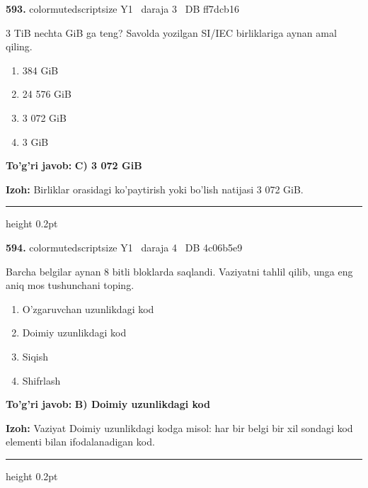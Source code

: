 \documentclass[10pt,a4paper,oneside]{article}
\begin{document}
\noindent\textbf{\color{ink}593.}  {color{muted}scriptsize Y1 \textbullet\ daraja 3 \textbullet\ DB ff7dcb16}
\par
3 TiB nechta GiB ga teng? Savolda yozilgan SI/IEC birliklariga aynan amal qiling.
\begin{enumerate}[label=\Alph*),leftmargin=9mm]
\item 384 GiB
\item 24 576 GiB
\item 3 072 GiB
\item 3 GiB
\end{enumerate}
\begin{tcolorbox}[enhanced,breakable,colback=teal!4,colframe=teal!50!black,boxrule=0.5pt,arc=1.1mm,left=3mm,right=3mm,top=1.7mm,bottom=1.7mm,before skip=2mm,after skip=2mm]
\textbf{\color{teal}To'g'ri javob:} \textbf{C) 3 072 GiB}
\par\smallskip
\textbf{Izoh:} Birliklar orasidagi ko'paytirish yoki bo'lish natijasi 3 072 GiB.
\end{tcolorbox}
\vspace{2mm}\hrule height 0.2pt \vspace{3mm}

\noindent\textbf{\color{ink}594.}  {color{muted}scriptsize Y1 \textbullet\ daraja 4 \textbullet\ DB 4c06b5e9}
\par
Barcha belgilar aynan 8 bitli bloklarda saqlandi. Vaziyatni tahlil qilib, unga eng aniq mos tushunchani toping.
\begin{enumerate}[label=\Alph*),leftmargin=9mm]
\item O'zgaruvchan uzunlikdagi kod
\item Doimiy uzunlikdagi kod
\item Siqish
\item Shifrlash
\end{enumerate}
\begin{tcolorbox}[enhanced,breakable,colback=teal!4,colframe=teal!50!black,boxrule=0.5pt,arc=1.1mm,left=3mm,right=3mm,top=1.7mm,bottom=1.7mm,before skip=2mm,after skip=2mm]
\textbf{\color{teal}To'g'ri javob:} \textbf{B) Doimiy uzunlikdagi kod}
\par\smallskip
\textbf{Izoh:} Vaziyat Doimiy uzunlikdagi kodga misol: har bir belgi bir xil sondagi kod elementi bilan ifodalanadigan kod.
\end{tcolorbox}
\vspace{2mm}\hrule height 0.2pt \vspace{3mm}
\end{document}
